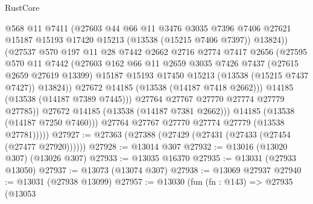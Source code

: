\begin{lexlean}{RustCore}
\begin{coremodule}
                        @568
                        @11
                        @7411
                        (@27603
                          @44
                          @66
                          @11
                          @3476
                          @3035
                          @7396
                          @7406
                          @27621
                          @15187
                          @15193
                          @17420
                          @15213
                          (@13538 (@15215 @7406 @7397))
                          @13824))
                      (@27537
                        @570
                        @197
                        @11
                        @28
                        @7442
                        @2662
                        @2716
                        @2774
                        @7417
                        @2656
                        (@27595
                          @570
                          @11
                          @7442
                          (@27603
                            @162
                            @66
                            @11
                            @2659
                            @3035
                            @7426
                            @7437
                            (@27615 @2659 @27619 @13399)
                            @15187
                            @15193
                            @17450
                            @15213
                            (@13538 (@15215 @7437 @7427))
                            @13824))
                        @27672
                        @14185
                        (@13538 (@14187 @7418 @2662)))
                      @14185
                      (@13538 (@14187 @7389 @7445)))
                    @27764
                    @27767
                    @27770
                    @27774
                    @27779
                    @27785))
                @27672
                @14185
                (@13538 (@14187 @7381 @2662)))
              @14185
              (@13538 (@14187 @7250 @7460)))
            @27764
            @27767
            @27770
            @27774
            @27779
            (@13538 @27781)))))
@27927 := @27363 (@27388 (@27429 (@27431 (@27433 (@27454 (@27477 @27920))))))
@27928 := @13014 @307
@27932 := @13016 (@13020 @307) (@13026 @307)
@27933 := @13035 @16370
@27935 := @13031 (@27933 @13050)
@27937 := @13073 (@13074 @307)
@27938 := @13069 @27937
@27940 := @13031 (@27938 @13099)
@27957 := @13030
    (fun (fn : @143) =>
    @27935
      (@13053

\end{coremodule}
\end{lexlean}

